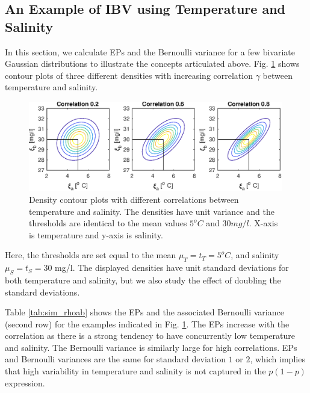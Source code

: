 \documentclass[aoas]{imsart}
\begin{document}
\subsection{An Example of IBV using Temperature and Salinity}

In this section, we calculate EPs and the Bernoulli variance for a few bivariate
Gaussian distributions to illustrate the concepts articulated above.
Fig. \ref{illus_bivarDens} shows contour plots of three different
densities with increasing correlation $\gamma$ between temperature and
salinity.
\begin{figure}[h!] \centering
  \includegraphics[width=0.99\textwidth]{Figures/illus_bivar.eps}
  \caption{Density contour plots with different correlations between
    temperature and salinity. The densities have unit variance and the
    thresholds are identical to the mean values $5^o C$ and
    $30 mg/l$. X-axis is temperature and y-axis is salinity.}
\label{illus_bivarDens}
\end{figure}
Here, the thresholds are set equal to the mean $\mu_T=t_T=5^o C$, and
salinity $\mu_S=t_S=30$ mg/l. The displayed densities have unit
standard deviations for both temperature and salinity, but we also
study the effect of doubling the standard deviations.

Table \ref{tab:sim_rhoab} shows the EPs and the associated Bernoulli
variance (second row) for the examples indicated in
Fig. \ref{illus_bivarDens}. The EPs increase with the correlation as
there is a strong tendency to have concurrently low temperature and
salinity. The Bernoulli variance is similarly large for high
correlations. EPs and Bernoulli variances are the same for standard
deviation $1$ or $2$, which implies that high variability in
temperature and salinity is not captured in the $p(1-p)$ expression.
\end{document}
